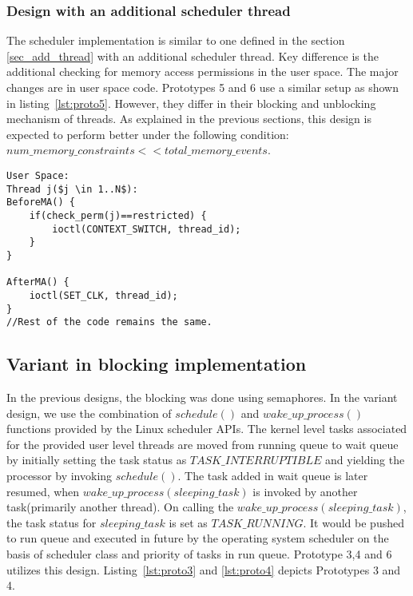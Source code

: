 \subsubsection{Design with an additional scheduler thread}

The scheduler implementation is similar to one defined in the section \ref{sec_add_thread} with an additional scheduler thread. 
Key difference is the additional checking for memory access permissions in the user space. 
The major changes are in user space code. 
Prototypes 5 and 6 use a similar setup as shown in listing~\ref{lst:proto5}. 
However, they differ in their blocking and unblocking mechanism of threads. 
As explained in the previous sections, this design is expected to perform better under the following condition: $num\_memory\_constraints << total\_memory\_events$. 

\begin{lstlisting}[mathescape=true,caption={Pseudo Code for Prototype 5 and 6}, style=customc,frame=tlrb,label={lst:proto5}]
User Space:
Thread j($j \in 1..N$):
BeforeMA() {	
	if(check_perm(j)==restricted) {
		ioctl(CONTEXT_SWITCH, thread_id);	
	}
}

AfterMA() {	
	ioctl(SET_CLK, thread_id);
}
//Rest of the code remains the same.
\end{lstlisting}
\subsection{Variant in blocking implementation}

In the previous designs, the blocking was done using semaphores. 
In the variant design, we use the combination of $schedule()$ and $wake\_up\_process()$ functions provided by the Linux scheduler APIs. 
The kernel level tasks associated for the provided user level threads are moved from running queue to wait queue by initially setting the task status as $TASK\_INTERRUPTIBLE$ and yielding the processor by invoking $schedule()$. 
The task added in wait queue is later resumed, when $wake\_up\_process(sleeping\_task)$ is invoked by another task(primarily another thread). 
On calling the $wake\_up\_process(sleeping\_task)$, the task status for $sleeping\_task$ is set as $TASK\_RUNNING$. 
It would be pushed to run queue and executed in future by the operating system scheduler on the basis of scheduler class and priority of tasks in run queue. 
Prototype 3,4 and 6 utilizes this design.
Listing~\ref{lst:proto3} and \ref{lst:proto4} depicts Prototypes 3 and 4.  

